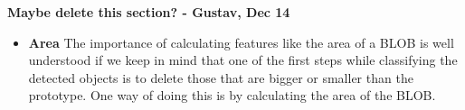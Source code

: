\textbf{Maybe delete this section? - Gustav, Dec 14}

\begin{itemize}
\item \textbf{Area}
The importance of calculating features like the area of a BLOB is well understood if we keep in mind that one of the first steps while classifying the detected objects is to delete those that are bigger or smaller than the prototype. One way of doing this is by calculating the area of the BLOB.



\end{itemize}
